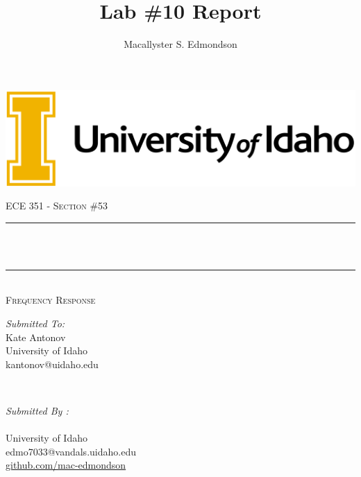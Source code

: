 \documentclass[12pt]{report}
\title{Lab \#10 Report}
\author{Macallyster S. Edmondson}
\date{\longdate\displaydate{date}}
\makeatletter
\let\thetitle\@title
\let\theauthor\@author
\makeatother
\begin{document}
\begin{titlepage}\thispagestyle{titlepage}
\centering
\includegraphics[scale = 0.12]{univ-logo.png}\\[1.0 cm]
\begin{center}    \textsc{\Large   ECE 351 - Section \#53 }\\[2.0 cm]
\end{center}%

\rule{\linewidth}{0.2 mm} \\[0.4 cm]
{ \huge \bfseries \thetitle}\\
\rule{\linewidth}{0.2 mm} \\[0.5 cm]
\textsc{\Large Frequency Response }\\[1.5 cm] %
\begin{minipage}{0.4\textwidth}
\begin{flushleft} \large
\emph{Submitted To:}\\
Kate Antonov\\ \small
University of Idaho\\
kantonov@uidaho.edu\\
\hfill
\end{flushleft}
\end{minipage}~
\begin{minipage}{0.4\textwidth}
\begin{flushright} \large
\emph{Submitted By :} \\
\theauthor \\ \small
University of Idaho\\
edmo7033@vandals.uidaho.edu\\
\href{http://github.com/mac-edmondson}{github.com/mac-edmondson}\\
\end{flushright}
\end{minipage}\\[2 cm]
\vfill
\end{titlepage}
\tableofcontents\thispagestyle{customplain}
\pagebreak
\renewcommand{\thesection}{\arabic{section}}
\end{document}
